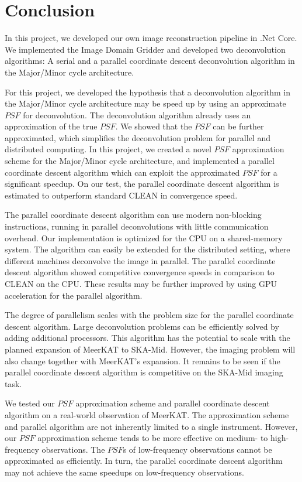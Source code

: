 \section{Conclusion}
In this project, we developed our own image reconstruction pipeline in .Net Core. We implemented the Image Domain Gridder\cite{veenboer2017image} and developed two deconvolution algorithms: A serial and a parallel coordinate descent deconvolution algorithm in the Major/Minor cycle architecture. 

For this project, we developed the hypothesis that a deconvolution algorithm in the Major/Minor cycle architecture may be speed up by using an approximate $PSF$ for deconvolution. The deconvolution algorithm already uses an approximation of the true $PSF$. We showed that the $PSF$ can be further approximated, which simplifies the deconvolution problem for parallel and distributed computing. In this project, we created a novel $PSF$ approximation scheme for the Major/Minor cycle architecture, and implemented a parallel coordinate descent algorithm which can exploit the approximated  $PSF$ for a significant speedup. On our test, the parallel coordinate descent algorithm is estimated to outperform standard CLEAN in convergence speed.

The parallel coordinate descent algorithm can use modern non-blocking instructions, running in parallel deconvolutions with little communication overhead. Our implementation is optimized for the CPU on a shared-memory system. The algorithm can easily be extended for the distributed setting, where different machines deconvolve the image in parallel. The parallel coordinate descent algorithm showed competitive convergence speeds in comparison to CLEAN on the CPU. These results may be further improved by using GPU acceleration for the parallel algorithm.

The degree of parallelism scales with the problem size for the parallel coordinate descent algorithm. Large deconvolution problems can be efficiently solved by adding additional processors. This algorithm has the potential to scale with the planned expansion of MeerKAT to SKA-Mid. However, the imaging problem will also change together with MeerKAT's expansion. It remains to be seen if the parallel coordinate descent algorithm is competitive on the SKA-Mid imaging task.

We tested our $PSF$ approximation scheme and parallel coordinate descent algorithm on a real-world observation of MeerKAT. The approximation scheme and parallel algorithm are not inherently limited to a single instrument. However, our $PSF$ approximation scheme tends to be more effective on medium- to high-frequency observations. The $PSF$s of low-frequency observations cannot be approximated as efficiently. In turn, the parallel coordinate descent algorithm may not achieve the same speedups on low-frequency observations.

